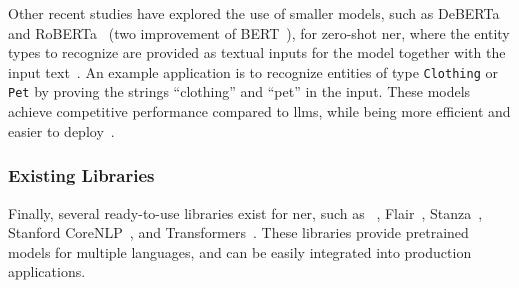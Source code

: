 Other recent studies have explored the use of smaller models, such as DeBERTa~\cite{HeGChen2023} and RoBERTa~\cite{liu2020roberta} (two improvement of BERT~\cite{devlin-etal-2019-bert}), for zero-shot \ac{ner}, where the entity types to recognize are provided as textual inputs for the model together with the input text~\cite{zaratiana-etal-2024-gliner,bogdanov-etal-2024-nuner}. An example application is to recognize entities of type \texttt{Clothing} or \texttt{Pet} by proving the strings ``clothing'' and ``pet'' in the input. These models achieve competitive performance compared to \acp{llm}, while being more efficient and easier to deploy~\cite{zaratiana-etal-2024-gliner,bogdanov-etal-2024-nuner}.



\subsubsection{Existing Libraries}
Finally, several ready-to-use libraries exist for \ac{ner}, such as \spacy~\cite{honnibal2020spacy}, Flair~\cite{akbik-etal-2019-flair}, Stanza~\cite{qi2020stanza}, Stanford CoreNLP~\cite{manning-EtAl:2014:P14-5}, and Transformers~\cite{wolf-etal-2020-transformers}. These libraries provide pretrained models for multiple languages, and can be easily integrated into production applications.


